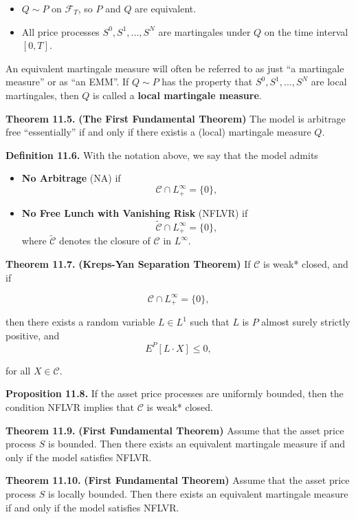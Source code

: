 \documentclass[
]{article}
\providecommand{\tightlist}{%
  \setlength{\itemsep}{0pt}\setlength{\parskip}{0pt}}
\begin{document}
\begin{itemize}
\tightlist
\item
  \(Q\sim P\) on \(\mathcal{F}_T\), so \(P\) and \(Q\) are equivalent.
\item
  All price processes \(S^0,S^1,...,S^N\) are martingales under \(Q\) on
  the time interval \([0,T]\).
\end{itemize}

An equivalent martingale measure will often be referred to as just ``a
martingale measure'' or as ``an EMM''. If \(Q\sim P\) has the property
that \(S^0,S^1,...,S^N\) are local martingales, then \(Q\) is called a
\textbf{local martingale measure}.

\textbf{Theorem 11.5.} \textbf{(The First Fundamental Theorem)} The
model is arbitrage free ``essentially'' if and only if there existis a
(local) martingale measure \(Q\).

\textbf{Definition 11.6.} With the notation above, we say that the model
admits

\begin{itemize}
\tightlist
\item
  \textbf{No Arbitrage} (NA) if \[
    \mathcal{C}\cap L_+^\infty=\{0\},
    \]
\item
  \textbf{No Free Lunch with Vanishing Risk} (NFLVR) if \[
    \tilde{\mathcal{C}}\cap L_+^\infty=\{0\},
    \] where \(\tilde{\mathcal{C}}\) denotes the closure of
  \(\mathcal{C}\) in \(L^\infty\).
\end{itemize}

\textbf{Theorem 11.7.} \textbf{(Kreps-Yan Separation Theorem)} If
\(\mathcal{C}\) is weak* closed, and if

\[
\mathcal{C}\cap L_+^\infty=\{0\},
\]

then there exists a random variable \(L\in L^1\) such that \(L\) is
\(P\) almost surely strictly positive, and \[
E^P[L\cdot X]\le 0,
\]

for all \(X\in\mathcal{C}\).

\textbf{Proposition 11.8.} If the asset price processes are uniformly
bounded, then the condition NFLVR implies that \(\mathcal{C}\) is weak*
closed.

\textbf{Theorem 11.9.} \textbf{(First Fundamental Theorem)} Assume that
the asset price process \(S\) is bounded. Then there exists an
equivalent martingale measure if and only if the model satisfies NFLVR.

\textbf{Theorem 11.10.} \textbf{(First Fundamental Theorem)} Assume that
the asset price process \(S\) is locally bounded. Then there exists an
equivalent martingale measure if and only if the model satisfies NFLVR.
\end{document}
